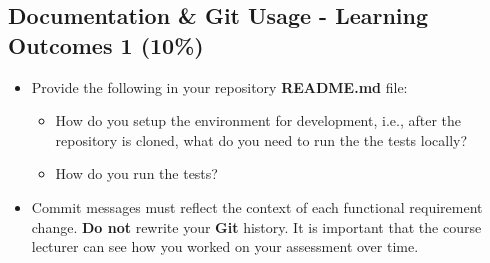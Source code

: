 \documentclass{article}
\begin{document}
\subsection*{Documentation \& Git Usage - Learning Outcomes 1 (10\%)}
\begin{itemize}
	\item Provide the following in your repository \textbf{README.md} file:
	      \begin{itemize}
		      \item How do you setup the environment for development, i.e., after the repository is cloned, what do you need to run the the tests locally?
					\item How do you run the tests?
	      \end{itemize}
			\end{itemize}
			\begin{itemize}
	\item Commit messages must reflect the context of each functional requirement change. \textbf{Do not} rewrite your \textbf{Git} history. It is important that the course lecturer can see how you worked on your assessment over time.
\end{itemize}
\end{document}
